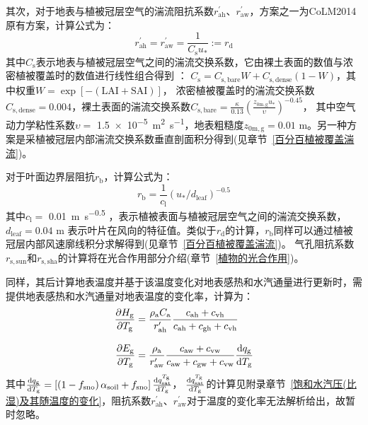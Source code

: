 其次，对于地表与植被冠层空气的湍流阻抗系数$r_{\mathrm{ah}}^\prime$、$r_{\mathrm{aw}}^\prime$，方案之一为CoLM2014原有方案，计算公式为：
\begin{equation}
  r_{\mathrm{a h}}^{\prime}=r_{\mathrm{a w}}^{\prime}=\frac{1}{C_{\mathrm{s}} u_{*}}:=r_{\mathrm{d}}
\end{equation}
其中$C_{\mathrm {s}}$表示地表与植被冠层空气之间的湍流交换系数，它由裸土表面的数值与浓密植被覆盖时的数值进行线性组合得到 \citep{zeng2005vegetation}：
$C_{\mathrm {s}}=C_{\mathrm{s,bare}}W+C_{\mathrm{s,dense}}\left(1-W\right)$，其中权重$W=\exp {\left[-(\text{LAI}+\text{SAI})\right]}$，
浓密植被覆盖时的湍流交换系数$C_{\mathrm{s,dense}}=0.004$，裸土表面的湍流交换系数$C_{\mathrm{s,bare}}=\frac{\kappa}{0.13}\left(\frac{z_{\mathrm{0m,g}}u_\ast}{\upsilon}\right)^{-0.45}$，
其中空气动力学粘性系数$\upsilon=$ \qty{1.5e-5}{m^2.s^{-1}}，地表粗糙度$z_{\mathrm{0m,g}}=0.01$ {m}。另一种方案是采植被冠层内部湍流交换系数垂直剖面积分得到(见章节~\ref{百分百植被覆盖湍流})。

对于叶面边界层阻抗$r_{\mathrm {b}}$，计算公式为：
\begin{equation}
  r_{\mathrm{b}}=\frac{1}{c_{\mathrm{l}}}\left(u_{*} / d_{\mathrm{{leaf }}}\right)^{-0.5}
\end{equation}
其中$c_{\mathrm {l}}=$ \qty{0.01}{m.s^{-0.5}} ，表示植被表面与植被冠层空气之间的湍流交换系数，$d_{\mathrm{leaf}}=0.04$ m 表示叶片在风向的特征值。类似于$r_{\mathrm {d}}$的计算，$r_{\mathrm {b}}$同样可以通过植被冠层内部风速廓线积分求解得到(见章节~\ref{百分百植被覆盖湍流})。
气孔阻抗系数$r_{\mathrm{s,sun}}$和$r_{\mathrm{s,sha}}$的计算将在光合作用部分介绍(章节~\ref{植物的光合作用})。

同样，其后计算地表温度并基于该温度变化对地表感热和水汽通量进行更新时，需提供地表感热和水汽通量对地表温度的变化率，计算为：
\begin{align}
  \frac{\partial H_{\mathrm{g}}}{\partial T_{\mathrm{g}}} & = \frac{\rho_{\mathrm{a}} C_{\mathrm{a}}}{r_{\mathrm{a h}}^{\prime}}
  \frac{c_{\mathrm{ah}}+c_{\mathrm{vh}}}{c_{\mathrm{ah}}+c_{\mathrm{gh}}+c_{\mathrm{vh}}} \\[2ex]
%
  \frac{\partial E_{\mathrm{g}}}{\partial T_{\mathrm{g}}} & =
  \frac{\rho_{\mathrm{a}}}{r_{\mathrm{a w}}^{\prime}} \frac{c_{\mathrm{aw}}+c_{\mathrm{vw}}}{c_{\mathrm{aw}}+c_{\mathrm{gw}}+c_{\mathrm{vw}}} \frac{{\rm d} q_{\mathrm{g}}}{{\rm d} T_{\mathrm{g}}}\label{Eg/Tg_2}
\end{align}
其中$\frac{{\rm d}q_{\mathrm {g}}}{{\rm d}T_{\mathrm {g}}}=\left[\left(1-f_{\mathrm{sno}}\right)\alpha_{\mathrm{soil}}+f_{\mathrm{sno}}\right]\frac{{\rm d}q_{\mathrm{sat}}^{T_{\mathrm {g}}}}{{\rm d}T_{\mathrm {g}}}$，
$\frac{{\rm d}q_{\mathrm{sat}}^{T_{\mathrm {g}}}}{{\rm d}T_{\mathrm {g}}}$的计算见附录章节~\ref{饱和水汽压(比湿)及其随温度的变化}，阻抗系数$r_{\mathrm{ah}}^\prime$、$r_{\mathrm{aw}}^\prime$对于温度的变化率无法解析给出，故暂时忽略。


